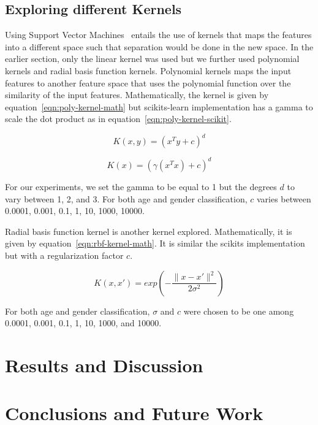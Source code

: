 \documentclass[a4paper]{llncs}
\begin{document}
\subsection{Exploring different Kernels}
Using Support Vector Machines~\cite{cortes1995support} entails the use of kernels that maps the features into a different space such that separation would be done in the new space. In the earlier section, only the linear kernel was used but we further used polynomial kernels and radial basis function kernels. Polynomial kernels maps the input features to another feature space that uses the polynomial function over the similarity of the input features. Mathematically, the kernel is given by equation~\ref{eqn:poly-kernel-math} but scikits-learn implementation has a gamma to scale the dot product as in equation~\ref{eqn:poly-kernel-scikit}.

\begin{equation}
K(x,y) = (x^Ty + c)^d
\label{eqn:poly-kernel-math}
\end{equation}

\begin{equation}
K(x) = (\gamma(x^Tx)+c)^d
\label{eqn:poly-kernel-scikit}
\end{equation}

For our experiments, we set the gamma to be equal to 1 but the degrees $d$ to vary between 1, 2, and 3. For both age and gender classification, $c$ varies between 0.0001, 0.001, 0.1, 1, 10, 1000, 10000.   

Radial basis function kernel is another kernel explored. Mathematically, it is given by equation~\ref{eqn:rbf-kernel-math}. It is similar the scikits implementation but with a regularization factor $c$. 

\begin{equation}
K(x,x')= exp\left( -\frac{\parallel x-x'\parallel^2}{2\sigma^2} \right)
\label{eqn:rbf-kernel-math}
\end{equation} 

For both age and gender classification, $\sigma$ and $c$ were chosen to be one among 0.0001, 0.001, 0.1, 1, 10, 1000, and 10000.






\section{Results and Discussion}	



\section{Conclusions and Future Work}





\end{document}

